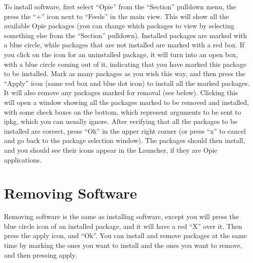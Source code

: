 \documentclass[12pt,letterpaper,oneside, openany]{book} \usepackage[latin1] {inputenc}
\begin{document}
To install software, first select ``Opie'' from the ``Section'' pulldown menu, the press the ``+'' icon next to ``Feeds'' in the main view.  This will show all the available Opie packages (you can change which packages to view by selecting something else from the ``Section'' pulldown).  Installed packages are marked with a blue circle, while packages that are not installed are marked with a red box.  If you click on the icon for an uninstalled package, it will turn into an open box, with a blue circle coming out of it, indicating that you have marked this package to be installed.  Mark as many packages as you wish this way, and then press the ``Apply'' icon (same red box and blue dot icon) to install all the marked packages.  It will also remove any packages marked for removal (see below).  Clicking this will open a window showing all the packages marked to be removed and installed, with some check boxes on the bottom, which represent arguments to be sent to ipkg, which you can usually ignore.  After verifying that all the packages to be installed are correct, press ``Ok'' in the upper right corner (or press ``x'' to cancel and go back to the package selection window).  The packages should then install, and you should see their icons appear in the Launcher, if they are Opie applications.

\section{Removing Software}

Removing software is the same as installing software, except you will press the blue circle icon of an installed package, and it will have a red ``X'' over it.  Then press the apply icon, and ``Ok''.  You can install and remove packages at the same time by marking the ones you want to install and the ones you want to remove, and then pressing apply.
\end{document}
